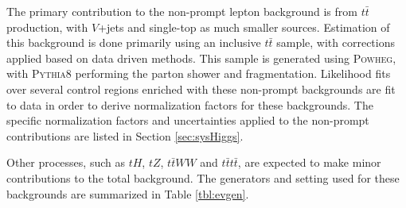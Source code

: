 The primary contribution to the non-prompt lepton background is from $t\bar{t}$ production, with $V$+jets and single-top as much smaller sources. Estimation of this background is done primarily using an inclusive $t\bar{t}$ sample, with corrections applied based on data driven methods. This sample is generated using \textsc{Powheg}, with \textsc{Pythia8} performing the parton shower and fragmentation. Likelihood fits over several control regions enriched with these non-prompt backgrounds are fit to data in order to derive normalization factors for these backgrounds. The specific normalization factors and uncertainties applied to the non-prompt contributions are listed in Section \ref{sec:sysHiggs}.

Other processes, such as $tH$, $tZ$, $t\bar{t}WW$ and $t\bar{t}t\bar{t}$, are expected to make minor contributions to the total background. The generators and setting used for these backgrounds are summarized in Table \ref{tbl:evgen}.

